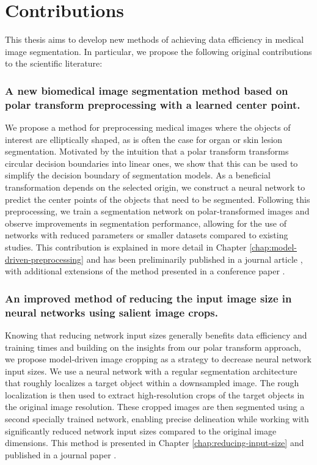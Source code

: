 \section{Contributions}

This thesis aims to develop new methods of achieving data efficiency in medical image segmentation. In particular, we propose the following original contributions to the scientific literature:

\subsubsection{A new biomedical image segmentation method based on polar transform preprocessing with a learned center point.}

We propose a method for preprocessing medical images where the objects of interest are elliptically shaped, as is often the case for organ or skin lesion segmentation. Motivated by the intuition that a polar transform transforms circular decision boundaries into linear ones, we show that this can be used to simplify the decision boundary of segmentation models. As a beneficial transformation depends on the selected origin, we construct a neural network to predict the center points of the objects that need to be segmented. Following this preprocessing, we train a segmentation network on polar-transformed images and observe improvements in segmentation performance, allowing for the use of networks with reduced parameters or smaller datasets compared to existing studies. This contribution is explained in more detail in Chapter \ref{chap:model-driven-preprocessing} and has been preliminarily published in a journal article \cite{bencevicTrainingPolarImage2021}, with additional extensions of the method presented in a conference paper \cite{bencevicUsingPolarTransform2022}.

\subsubsection{An improved method of reducing the input image size in neural networks using salient image crops.}

Knowing that reducing network input sizes generally benefits data efficiency and training times and building on the insights from our polar transform approach, we propose model-driven image cropping as a strategy to decrease neural network input sizes. We use a neural network with a regular segmentation architecture that roughly localizes a target object within a downsampled image. The rough localization is then used to extract high-resolution crops of the target objects in the original image resolution. These cropped images are then segmented using a second specially trained network, enabling precise delineation while working with significantly reduced network input sizes compared to the original image dimensions. This method is presented in Chapter \ref{chap:reducing-input-size} and published in a journal paper \cite{bencevicSegmentthenSegmentContextPreservingCropBased2023a}.


